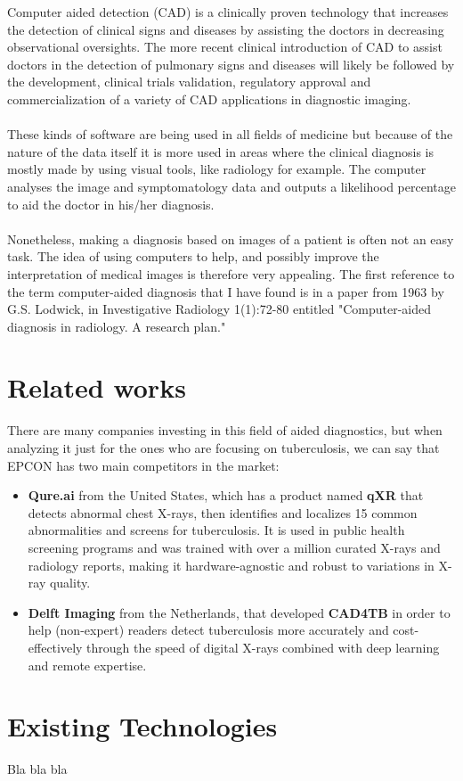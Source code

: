 Computer aided detection (CAD) is a clinically proven technology that increases the detection of clinical signs and diseases by assisting the doctors in decreasing observational oversights. The more recent clinical introduction of CAD to assist doctors in the detection of pulmonary signs and diseases will likely be followed by the development, clinical trials validation, regulatory approval and commercialization of a variety of CAD applications in diagnostic imaging. \cite{Castellino2005}
\\ \\
These kinds of software are being used in all fields of medicine but because of the nature of the data itself it is more used in areas where the clinical diagnosis is mostly made by using visual tools, like radiology for example. The computer analyses the image and symptomatology data and outputs a likelihood percentage to aid the doctor in his/her diagnosis.
\\ \\
Nonetheless, making a diagnosis based on images of a patient is often not an easy task. The idea of using computers to help, and possibly improve the interpretation of medical images is therefore very appealing. The first reference to the term computer-aided diagnosis that I have found is in a paper from 1963 by G.S. Lodwick, in Investigative Radiology 1(1):72-80 entitled "Computer-aided diagnosis in radiology. A research plan." \cite{Lodwick1966}


\section{Related works}

There are many companies investing in this field of aided diagnostics, but when analyzing it just for the ones who are focusing on tuberculosis, we can say that EPCON has two main competitors in the market:

\begin{itemize}

\item
\textbf{Qure.ai} from the United States, which has a product named \textbf{qXR} that detects abnormal chest X-rays, then identifies and localizes 15 common abnormalities and screens for tuberculosis. It is used in public health screening programs and was trained with over a million curated X-rays and radiology reports, making it hardware-agnostic and robust to variations in X-ray quality. \cite{QureAI}

\item 
\textbf{Delft Imaging} from the Netherlands, that developed \textbf{CAD4TB} in order to help (non-expert) readers detect tuberculosis more accurately and cost-effectively through the speed of digital X-rays combined with deep learning and remote expertise. \cite{DelftImaging}
	
\end{itemize}

\section{Existing Technologies}

Bla bla bla

